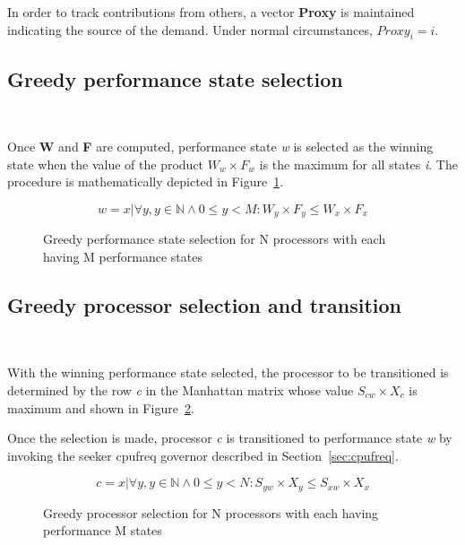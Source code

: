 In order to track contributions from others, a vector \textbf{Proxy} is maintained indicating 
the source of the demand. Under normal circumstances, $Proxy_i = i$. 

\subsection{Greedy performance state selection}~\label{sec:winner_state}

Once \textbf{W} and \textbf{F} are computed, performance state \textit{w} is selected
as the winning state when the value of the product $W_w \times F_w$ is the maximum 
for all states \textit{i}. The procedure is mathematically depicted in Figure~\ref{fig:winning_state}.

\begin{figure}[h!]
\centering
\begin{equation*}
    w = {x | \forall y, y \in \mathbb{N} \wedge 0 \leq y < M : W_y \times F_y \leq W_x \times F_x}
\end{equation*}
\caption{Greedy performance state selection for N processors with each having M performance states}
\label{fig:winning_state}
\end{figure}

\subsection{Greedy processor selection and transition}~\label{sec:winner_proc}

With the winning performance state selected, the processor to be transitioned
is determined by the row \textit{c} in the Manhattan matrix whose value $S_{cw} \times X_c$ 
is maximum and shown in Figure~\ref{fig:winning_proc}. 

Once the selection is made, processor \textit{c} is transitioned to performance state
\textit{w} by invoking the seeker cpufreq governor described in Section~\ref{sec:cpufreq}.

\begin{figure}[h!]
\centering
\begin{equation*}
    c = {x | \forall y, y \in \mathbb{N} \wedge 0 \leq y < N : S_{yw} \times X_y \leq S_{xw} \times X_x}
\end{equation*}
\caption{Greedy processor selection for N processors with each having performance M states}
\label{fig:winning_proc}
\end{figure}

